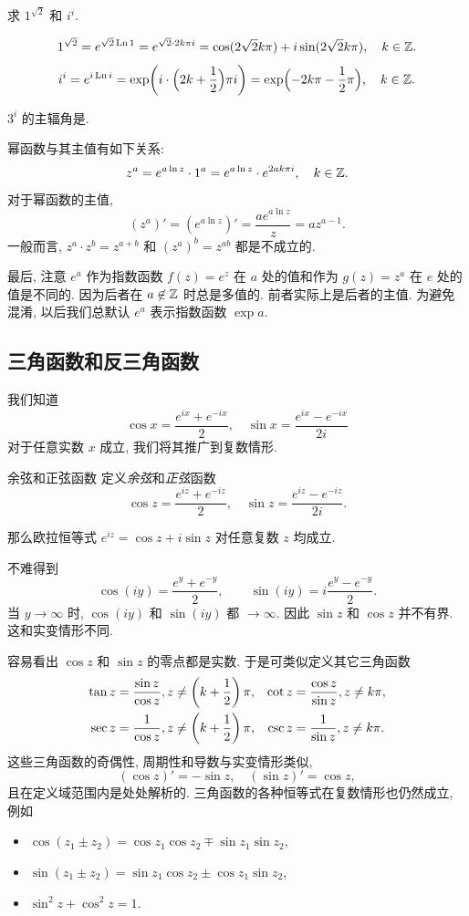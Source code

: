 \begin{example}
	求 $1^{\sqrt 2}$ 和 $i^i$.
\end{example}
\begin{solution}
	\[
    1^{\sqrt2}=e^{\sqrt2\operatorname{Ln}1}
      =e^{\sqrt 2\cdot 2k\pi i}
      =\cos(2\sqrt 2k\pi)+i\sin(2\sqrt 2k\pi), \quad k\in{\mathbb{Z}}.
  \]
	\[
    i^i=e^{i\operatorname{Ln} i}
      =\exp\biggl(i\cdot\Bigl(2k+\frac{1}{2}\Bigr)\pi i\biggr)
			=\exp\Bigl(-2k\pi-\frac{1}{2}\pi\Bigr), \quad k\in{\mathbb{Z}}.
  \]
\end{solution}

\begin{exercise}
	$3^i$ 的主辐角是\fillblank{}.
\end{exercise}

幂函数与其主值有如下关系:
\[
  z^a=e^{a\ln z}\cdot 1^a
    =e^{a\ln z}\cdot e^{2ak\pi i},\quad k\in{\mathbb{Z}}.
\]
对于幂函数的主值,
\[(z^a)'=\left(e^{a\ln z}\right)'=\frac{ae^{a\ln z}}z=az^{a-1}.\]
一般而言, $z^a\cdot z^b=z^{a+b}$ 和 $(z^a)^b=z^{ab}$ 都是不成立的.

最后, 注意 $e^a$ 作为指数函数 $f(z)=e^z$ 在 $a$ 处的值和作为 $g(z)=z^a$ 在 $e$ 处的值是\alert{不同}的.
因为后者在 $a\not\in{\mathbb{Z}}$ 时总是多值的.
前者实际上是后者的主值.
为避免混淆, 以后我们总\alert{默认 $e^a$ 表示指数函数 $\exp a$}.


\subsection{三角函数和反三角函数}

我们知道
  \[\cos x=\frac{e^{ix}+e^{-ix}}2,\quad
  \sin x=\frac{e^{ix}-e^{-ix}}{2i}\]
对于任意实数 $x$ 成立,
我们将其推广到复数情形.

\begin{definition}{余弦和正弦函数}
	定义\emph{余弦}和\emph{正弦}函数
	\[\cos z=\frac{e^{iz}+e^{-iz}}2,\quad
	\sin z=\frac{e^{iz}-e^{-iz}}{2i}.\]
\end{definition}
那么欧拉恒等式 \alert{$e^{iz}=\cos z+i\sin z$ 对任意复数 $z$ 均成立}.

不难得到
\[
	\cos(iy)=\dfrac{e^y+e^{-y}}2,\qquad
	{\sin(iy)=i\dfrac{e^y-e^{-y}}2.}
\]
当 $y\to\infty$ 时, $\cos(iy)$ 和 $\sin(iy)$ 都 $\to\infty$.
因此 \alert{$\sin z$ 和 $\cos z$ 并不有界}. 
这和实变情形不同.

容易看出 $\cos z$ 和 $\sin z$ 的零点都是实数.
于是可类似定义其它三角函数
\begin{align*}
	\tan z&=\frac{\sin z}{\cos z},z\neq\left(k+\frac{1}{2}\right)\pi,&
	\cot z&=\frac{\cos z}{\sin z},z\neq k\pi,\\
	\sec z&=\frac{1}{\cos z},z\neq\left(k+\frac{1}{2}\right)\pi,&
	\csc z&=\frac{1}{\sin z},z\neq k\pi.
\end{align*}
这些三角函数的奇偶性, 周期性和导数与实变情形类似,
  \[(\cos z)'=-\sin z,\quad
  (\sin z)'=\cos z,\]
且在定义域范围内是处处解析的.
三角函数的各种恒等式在复数情形也仍然成立, 例如
\begin{itemize}
	\item $\cos(z_1\pm z_2)=\cos z_1 \cos z_2\mp \sin z_1 \sin z_2$,
	\item $\sin(z_1\pm z_2)=\sin z_1 \cos z_2\pm\cos z_1 \sin z_2$,
	\item $\sin^2z+\cos^2z=1$.
\end{itemize}

